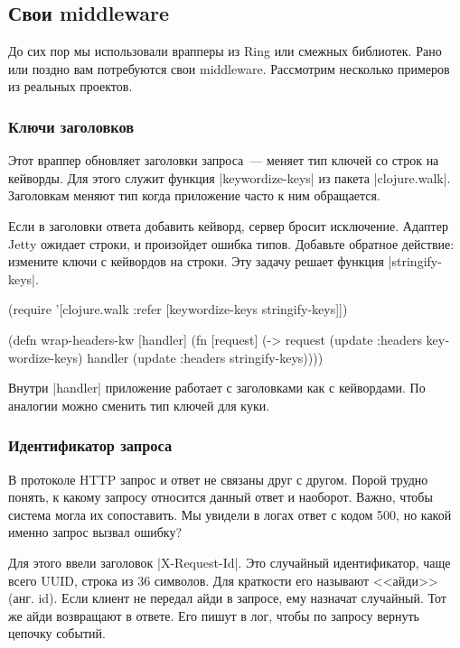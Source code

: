 \subsection{Свои middleware}

До сих пор мы использовали врапперы из Ring или смежных библиотек. Рано или
поздно вам потребуются свои middleware. Рассмотрим несколько примеров из
реальных проектов.

\subsubsection*{Ключи заголовков}

Этот враппер обновляет заголовки запроса~--- меняет тип ключей со строк на
кейворды. Для этого служит функция \spverb|keywordize-keys| из пакета
\spverb|clojure.walk|. Заголовкам меняют тип когда приложение часто к ним
обращается.

Если в заголовки ответа добавить кейворд, сервер бросит исключение. Адаптер
Jetty ожидает строки, и произойдет ошибка типов. Добавьте обратное действие:
измените ключи с кейвордов на строки. Эту задачу решает функция
\spverb|stringify-keys|.

\begin{english}
  \begin{clojure}
(require '[clojure.walk :refer
           [keywordize-keys stringify-keys]])

(defn wrap-headers-kw [handler]
  (fn [request]
    (-> request
        (update :headers keywordize-keys)
        handler
        (update :headers stringify-keys))))
  \end{clojure}
\end{english}

Внутри \spverb|handler| приложение работает с заголовками как с кейвордами. По
аналогии можно сменить тип ключей для куки.

\subsubsection*{Идентификатор запроса}

В протоколе HTTP запрос и ответ не связаны друг с другом. Порой трудно понять, к
какому запросу относится данный ответ и наоборот. Важно, чтобы система могла их
сопоставить. Мы увидели в логах ответ с кодом 500, но какой именно запрос вызвал
ошибку?

Для этого ввели заголовок \spverb|X-Request-Id|. Это случайный идентификатор,
чаще всего UUID, строка из 36 символов. Для краткости его называют <<айди>>
(анг. id). Если клиент не передал айди в запросе, ему назначат случайный. Тот же
айди возвращают в ответе. Его пишут в лог, чтобы по запросу вернуть цепочку
событий.

